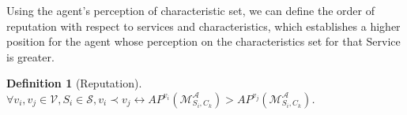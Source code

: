 \documentclass[compsoc, conference, letterpaper, 10pt, times]{IEEEtran}
\newtheorem{definition}{Definition}
\begin{document}
Using the agent's perception of characteristic set, we can define the order of reputation with respect to services and characteristics, which establishes a higher position for the agent whose perception on the characteristics set for that Service is greater.

\begin{definition}[Reputation]
$\forall v_{i}, v_{j}\in \mathcal{V}, S_{i}\in \mathcal{S}, v_{i}\prec v_{j} \leftrightarrow AP^{v_{i}}(\mathcal{M}^{\mathcal{A}}_{S_{i}, C_{k}})>AP^{v_{j}}(\mathcal{M}^{\mathcal{A}}_{S_{i}, C_{k}})$.
\end{definition}




\end{document}
